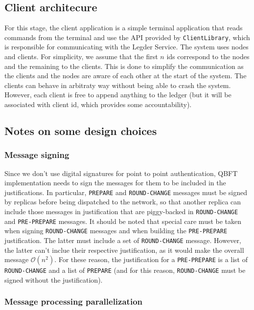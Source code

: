 \documentclass{article}
\begin{document}
\subsection{Client architecure}
For this stage, the client application is a simple terminal application that reads commands from the terminal and use 
the API provided by \texttt{ClientLibrary}, which is responsible for communicating with the Legder Service. 
The system uses nodes and clients. For simplicity, we assume that the first $n$ ids correspond to the 
nodes and the remaining to the clients. This is done to simplify the communication as the clients and the 
nodes are aware of each other at the start of the system.
The clients can behave in arbitraty way without being able to crash the system.
However, each client is free to append anything to the ledger (but it will be
associated with client id, which provides some accountability).

\subsection{Notes on some design choices}

\subsubsection{Message signing}

Since we don't use digital signatures for point to point authentication, QBFT
implementation needs to sign the messages for them to be included in the justifications.
In particular, \texttt{PREPARE} and \texttt{ROUND-CHANGE} messages must be signed
by replicas before being dispatched to the network, so that another replica
can include those messages in justification that are piggy-backed in \texttt{ROUND-CHANGE}
and \texttt{PRE-PREPARE} messages.
It should be noted that special care must be taken when signing \texttt{ROUND-CHANGE}
messages and when building the \texttt{PRE-PREPARE} justification. The latter
must include a set of \texttt{ROUND-CHANGE} message. However, the latter can't 
inclue their respective justification, as it would make the overall message
$\mathcal{O}(n^2)$. For these reason, the justification for a \texttt{PRE-PREPARE}
is a list of \texttt{ROUND-CHANGE} and a list of \texttt{PREPARE} (and for this
reason, \texttt{ROUND-CHANGE} must be signed without the justification).

\subsubsection{Message processing parallelization}
\end{document}
